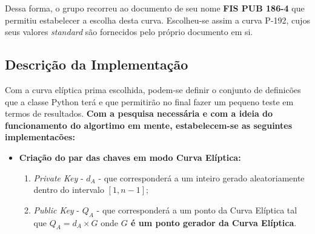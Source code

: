 \documentclass[12pt]{report}
\providecommand{\tightlist}{%
      \setlength{\itemsep}{0pt}\setlength{\parskip}{0pt}}
\begin{document}
Dessa forma, o grupo recorreu ao documento de seu nome \textbf{FIS PUB
186-4} que permitiu estabelecer a escolha desta curva. Escolheu-se assim
a curva P-192, cujos seus valores \emph{standard} são fornecidos pelo
próprio documento em si.
\vspace{5 mm}
\subsection{Descrição da
Implementação}\label{descriuxe7uxe3o-da-implementauxe7uxe3o}
\vspace{2 mm}
Com a curva elíptica prima escolhida, podem-se definir o conjunto de
definicões que a classe Python terá e que permitirão no final fazer um
pequeno teste em termos de resultados.
\vspace{2 mm}
\textbf{Com a pesquisa necessária e com a ideia do funcionamento do
algortimo em mente, estabelecem-se as seguintes implementacões:}
\vspace{2 mm}
\begin{itemize}
\tightlist
\item
  \textbf{Criação do par das chaves em modo Curva Elíptica:}

\vspace{2 mm}
\begin{enumerate}
\def\labelenumi{\arabic{enumi}.}
\tightlist
\vspace{2 mm}
\item
  \emph{Private Key} - \(d_{A}\) - que corresponderá a um inteiro gerado
  aleatoriamente dentro do intervalo \([1, n-1]\);
\vspace{2 mm}
\item
  \emph{Public Key} - \(Q_{A}\) - que corresponderá a um ponto da Curva
  Elíptica tal que \(Q_{A} = d_{A} \times G\)
\vspace{2 mm} onde
\textbf{\(G\) é um ponto gerador da Curva Elíptica}.

\end{enumerate}
\end{itemize}
\vspace{2 mm}
\end{document}
